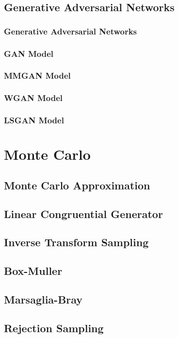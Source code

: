 \documentclass{article}
\begin{document}
\subsection{Generative Adversarial Networks}
\subsubsection{Generative Adversarial Networks}
\subsubsection{GAN Model}
\subsubsection{MMGAN Model}
\subsubsection{WGAN Model}
\subsubsection{LSGAN Model}


\section{Monte Carlo}
\subsection{Monte Carlo Approximation}
\subsection{Linear Congruential Generator}
\subsection{Inverse Transform Sampling}
\subsection{Box-Muller}
\subsection{Marsaglia-Bray}
\subsection{Rejection Sampling}
\end{document}
